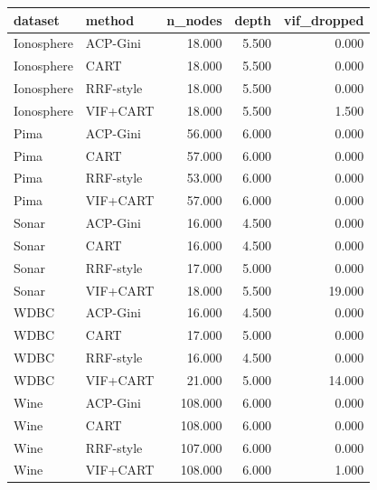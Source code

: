 \begin{tabular}{llrrr}
\toprule
dataset & method & n\_nodes & depth & vif\_dropped \\
\midrule
Ionosphere & ACP-Gini & 18.000 & 5.500 & 0.000 \\
Ionosphere & CART & 18.000 & 5.500 & 0.000 \\
Ionosphere & RRF-style & 18.000 & 5.500 & 0.000 \\
Ionosphere & VIF+CART & 18.000 & 5.500 & 1.500 \\
Pima & ACP-Gini & 56.000 & 6.000 & 0.000 \\
Pima & CART & 57.000 & 6.000 & 0.000 \\
Pima & RRF-style & 53.000 & 6.000 & 0.000 \\
Pima & VIF+CART & 57.000 & 6.000 & 0.000 \\
Sonar & ACP-Gini & 16.000 & 4.500 & 0.000 \\
Sonar & CART & 16.000 & 4.500 & 0.000 \\
Sonar & RRF-style & 17.000 & 5.000 & 0.000 \\
Sonar & VIF+CART & 18.000 & 5.500 & 19.000 \\
WDBC & ACP-Gini & 16.000 & 4.500 & 0.000 \\
WDBC & CART & 17.000 & 5.000 & 0.000 \\
WDBC & RRF-style & 16.000 & 4.500 & 0.000 \\
WDBC & VIF+CART & 21.000 & 5.000 & 14.000 \\
Wine & ACP-Gini & 108.000 & 6.000 & 0.000 \\
Wine & CART & 108.000 & 6.000 & 0.000 \\
Wine & RRF-style & 107.000 & 6.000 & 0.000 \\
Wine & VIF+CART & 108.000 & 6.000 & 1.000 \\
\bottomrule
\end{tabular}
